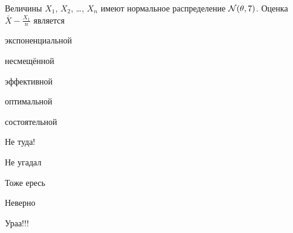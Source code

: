 
\begin{question}
Величины \(X_1\), \(X_2\), \ldots, \(X_n\) имеют нормальное
распределение \(\mathcal{N}(\theta, 7)\). Оценка \(\bar X - \frac{X_1}{n}\)
является
\begin{answerlist}
  \item экспоненциальной
  \item несмещённой
  \item эффективной
  \item оптимальной
  \item состоятельной
\end{answerlist}
\end{question}

\begin{solution}
\begin{answerlist}
  \item Не туда!
  \item Не угадал
  \item Тоже ересь
  \item Неверно
  \item Ураа!!!
\end{answerlist}
\end{solution}

